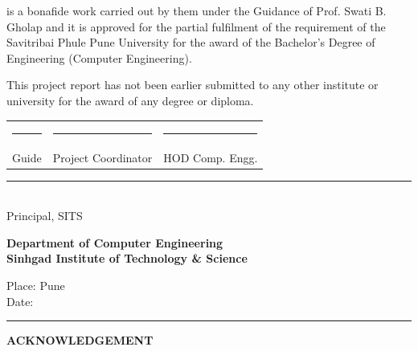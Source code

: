 \documentclass[12pt,a4paper]{report}
\begin{document}
\vspace{0.5\baselineskip}

is a bonafide work carried out by them under the Guidance of Prof. Swati B. Gholap and it is approved for the partial fulfilment of the requirement of the Savitribai Phule Pune University for the award of the Bachelor's Degree of Engineering (Computer Engineering).

\vspace{0.5\baselineskip}

This project report has not been earlier submitted to any other institute or university for the award of any degree or diploma.

\vspace{3\baselineskip}

\begin{tabular}{p{4cm}p{5cm}p{4cm}}
\centering \rule{3.5cm}{0.4pt} & \centering \rule{4cm}{0.4pt} & \centering\arraybackslash \rule{3.5cm}{0.4pt} \\
\centering Guide & \centering Project Coordinator & \centering\arraybackslash HOD Comp. Engg. \\
\end{tabular}

\vspace{2\baselineskip}

\begin{center}
\rule{4cm}{0.4pt}\\
Principal, SITS
\end{center}

\vspace{1\baselineskip}

\textbf{Department of Computer Engineering}\\
\textbf{Sinhgad Institute of Technology \& Science}

\vspace{0.5\baselineskip}

Place: Pune\\
Date: \rule{3cm}{0.4pt}

\newpage
\thispagestyle{plain}
\begin{center}
\vspace*{1\baselineskip}
{\fontsize{14}{16}\selectfont \textbf{ACKNOWLEDGEMENT}}
\vspace{1.5\baselineskip}
\end{center}
\end{document}
